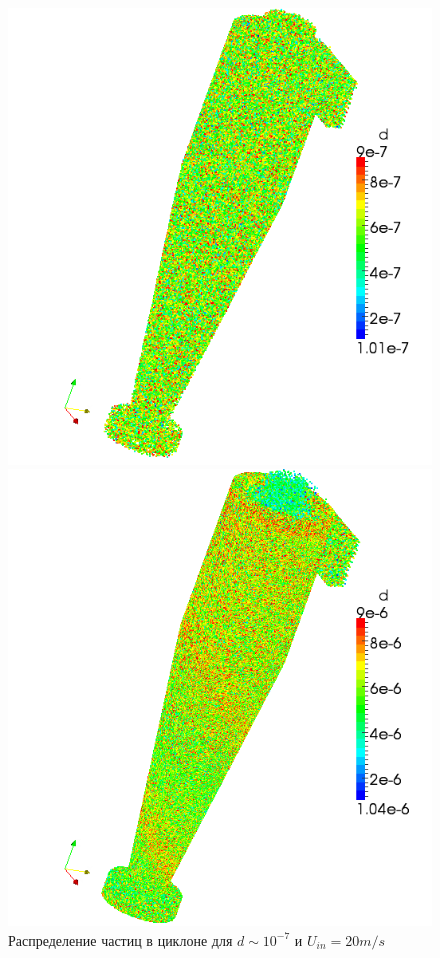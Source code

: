 \begin{figure}[h]
 	\vspace{-4em}
	\begin{minipage}{0.475\linewidth}
		\includegraphics[scale=0.4]{parcelsCyclone1}
		\caption{Распределение частиц в циклоне для $d \sim 10^{-7}$ и $U_{in} = 20m/s$}
		\label{fig:parcelsCyclone1}
	\end{minipage}
	\hspace{0.5em}
	\begin{minipage}{0.475\linewidth}
		\includegraphics[scale=0.4]{parcelsCyclone2}

\end{minipage}
\end{figure}
